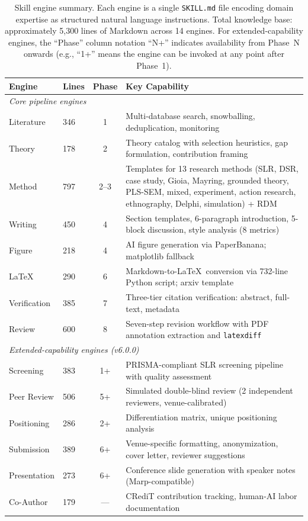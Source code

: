 \documentclass{article}
\begin{document}
\begin{table}[t]
\centering
\caption{Skill engine summary. Each engine is a single \texttt{SKILL.md} file encoding domain expertise as structured natural language instructions. Total knowledge base: approximately 5,300 lines of Markdown across 14 engines. For extended-capability engines, the ``Phase'' column notation ``N+'' indicates availability from Phase~N onwards (e.g., ``1+'' means the engine can be invoked at any point after Phase~1).}
\label{tab:engines}
\begin{tabularx}{\textwidth}{llcX}
\toprule
\textbf{Engine} & \textbf{Lines} & \textbf{Phase} & \textbf{Key Capability} \\
\midrule
\multicolumn{4}{l}{\emph{Core pipeline engines}} \\
Literature & 346 & 1 & Multi-database search, snowballing, deduplication, monitoring \\
Theory & 178 & 2 & Theory catalog with selection heuristics, gap formulation, contribution framing \\
Method & 797 & 2--3 & Templates for 13 research methods (SLR, DSR, case study, Gioia, Mayring, grounded theory, PLS-SEM, mixed, experiment, action research, ethnography, Delphi, simulation) + RDM \\
Writing & 450 & 4 & Section templates, 6-paragraph introduction, 5-block discussion, style analysis (8 metrics) \\
Figure & 218 & 4 & AI figure generation via PaperBanana; matplotlib fallback \\
\LaTeX & 290 & 6 & Markdown-to-\LaTeX\ conversion via 732-line Python script; arxiv template \\
Verification & 385 & 7 & Three-tier citation verification: abstract, full-text, metadata \\
Review & 600 & 8 & Seven-step revision workflow with PDF annotation extraction and \texttt{latexdiff} \\
\midrule
\multicolumn{4}{l}{\emph{Extended-capability engines (v6.0.0)}} \\
Screening & 383 & 1+ & PRISMA-compliant SLR screening pipeline with quality assessment \\
Peer Review & 506 & 5+ & Simulated double-blind review (2 independent reviewers, venue-calibrated) \\
Positioning & 286 & 2+ & Differentiation matrix, unique positioning analysis \\
Submission & 389 & 6+ & Venue-specific formatting, anonymization, cover letter, reviewer suggestions \\
Presentation & 273 & 6+ & Conference slide generation with speaker notes (Marp-compatible) \\
Co-Author & 179 & --- & CRediT contribution tracking, human-AI labor documentation \\
\bottomrule
\end{tabularx}
\end{table}
\end{document}

